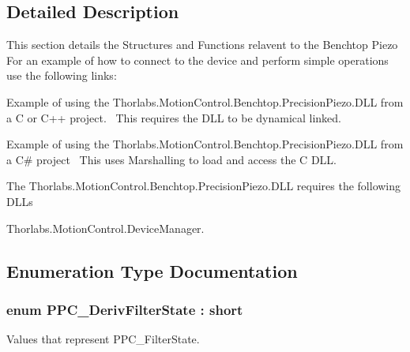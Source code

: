 \subsection{Detailed Description}
This section details the Structures and Functions relavent to the Benchtop Piezo~\newline
 For an example of how to connect to the device and perform simple operations use the following links\+: 
\begin{DoxyItemize}
\item Example of using the Thorlabs.Motion\+Control.Benchtop.Precision\+Piezo.D\+LL from a C or C++ project.~\newline
 This requires the D\+LL to be dynamical linked.  
\item Example of using the Thorlabs.Motion\+Control.Benchtop.Precision\+Piezo.D\+LL from a C\# project~\newline
 This uses Marshalling to load and access the C D\+LL.  
\end{DoxyItemize}The Thorlabs.\+Motion\+Control.\+Benchtop.\+Precision\+Piezo.\+D\+LL requires the following D\+L\+Ls 
\begin{DoxyItemize}
\item Thorlabs.\+Motion\+Control.\+Device\+Manager.  
\end{DoxyItemize}

\subsection{Enumeration Type Documentation}
\subsubsection[{\texorpdfstring{P\+P\+C\+\_\+\+Deriv\+Filter\+State}{PPC_DerivFilterState}}]{\setlength{\rightskip}{0pt plus 5cm}enum {\bf P\+P\+C\+\_\+\+Deriv\+Filter\+State} \+: short}\hypertarget{group___benchtop_precision_piezo_ga59c677623dc0d8e960f123455ba8c864}{}\label{group___benchtop_precision_piezo_ga59c677623dc0d8e960f123455ba8c864}


Values that represent P\+P\+C\+\_\+\+Filter\+State. 

